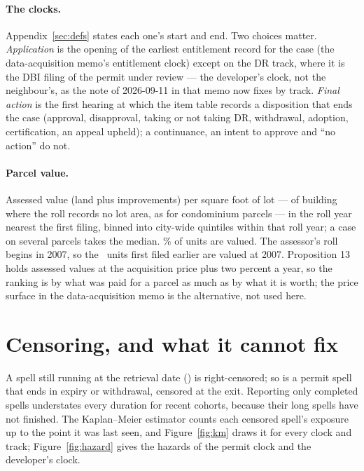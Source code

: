 \documentclass[11pt]{article}
\begin{document}
\paragraph{The clocks.} Appendix~\ref{sec:defs} states each one's start and end. Two choices
matter. \emph{Application} is the opening of the earliest entitlement record for the case (the
data-acquisition memo's entitlement clock) except on the DR track, where it is the DBI filing of
the permit under review --- the developer's clock, not the neighbour's, as the note of
2026-09-11 in that memo now fixes by track. \emph{Final action} is the first hearing at which the
item table records a disposition that ends the case (approval, disapproval, taking or not taking
DR, withdrawal, adoption, certification, an appeal upheld); a continuance, an intent to approve
and ``no action'' do not.

\paragraph{Parcel value.} Assessed value (land plus improvements) per square foot of lot ---
of building where the roll records no lot area, as for condominium parcels --- in the roll year
nearest the first filing, binned into city-wide quintiles within that roll year; a case on
several parcels takes the median. \ckValueCover\% of units are valued. The assessor's roll
begins in 2007, so the \ckValuedLater\ units first filed earlier are valued at 2007. Proposition
13 holds assessed values at the acquisition price plus two percent a year, so the ranking is by
what was paid for a parcel as much as by what it is worth; the price surface in the
data-acquisition memo is the alternative, not used here.



\section{Censoring, and what it cannot fix}

A spell still running at the retrieval date (\ckRetrieved) is right-censored; so is a permit
spell that ends in expiry or withdrawal, censored at the exit. Reporting only completed spells
understates every duration for recent cohorts, because their long spells have not finished.
The Kaplan--Meier estimator counts each censored spell's exposure up to the point it was last
seen, and Figure~\ref{fig:km} draws it for every clock and track; Figure~\ref{fig:hazard} gives
the hazards of the permit clock and the developer's clock.
\end{document}
